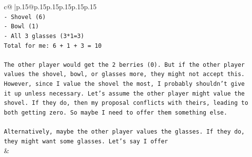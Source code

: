 \documentclass{article}
\begin{document}
{\begin{supertabular}{c@{$\;$}|p{.15\linewidth}@{}p{.15\linewidth}p{.15\linewidth}p{.15\linewidth}p{.15\linewidth}p{.15\linewidth}}
{{{\\ 
\texttt{{-} Shovel (6)} \\
\texttt{{-} Bowl (1)} \\
\texttt{{-} All 3 glasses (3*1=3)} \\
\texttt{Total for me: 6 + 1 + 3 = 10} \\
\\ 
\texttt{The other player would get the 2 berries (0). But if the other player values the shovel, bowl, or glasses more, they might not accept this. However, since I value the shovel the most, I probably shouldn't give it up unless necessary. Let's assume the other player might value the shovel. If they do, then my proposal conflicts with theirs, leading to both getting zero. So maybe I need to offer them something else.} \\
\\ 
\texttt{Alternatively, maybe the other player values the glasses. If they do, they might want some glasses. Let's say I offer} \\
            }
        }
    }
    & \\ \\


\end{supertabular}}
\end{document}
